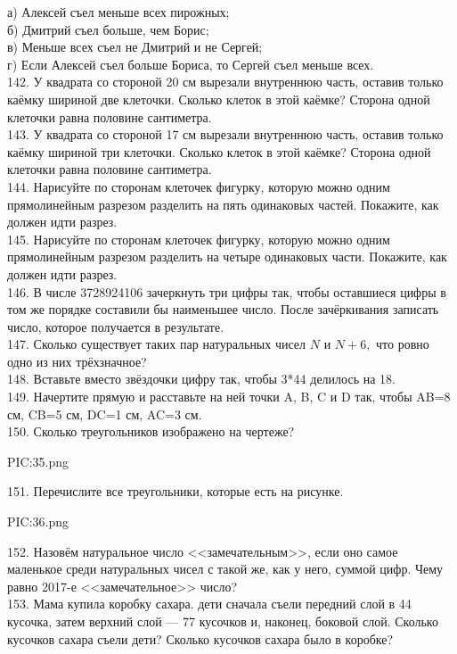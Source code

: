 а) Алексей съел меньше всех пирожных;\\
б) Дмитрий съел больше, чем Борис;\\
в) Меньше всех съел не Дмитрий и не Сергей;\\
г) Если Алексей съел больше Бориса, то Сергей съел меньше всех.\\
142. У квадрата со стороной 20 см вырезали внутреннюю часть, оставив только каёмку шириной две клеточки. Сколько клеток в этой каёмке? Сторона одной клеточки равна половине сантиметра.\\
143. У квадрата со стороной 17 см вырезали внутреннюю часть, оставив только каёмку шириной три клеточки. Сколько клеток в этой каёмке? Сторона одной клеточки равна половине сантиметра.\\
144. Нарисуйте по сторонам клеточек фигурку, которую можно одним прямолинейным разрезом разделить на пять одинаковых частей. Покажите, как должен идти разрез.\\
145. Нарисуйте по сторонам клеточек фигурку, которую можно одним прямолинейным разрезом разделить на четыре одинаковых части. Покажите, как должен идти разрез.\\
146. В числе 3728924106 зачеркнуть три цифры так, чтобы оставшиеся цифры в том же порядке составили бы наименьшее число. После зачёркивания записать число, которое получается в результате.\\
147. Сколько существует таких пар натуральных чисел $N$ и $N+6,$ что ровно одно из них трёхзначное?\\
148. Вставьте вместо звёздочки цифру так, чтобы 3*44 делилось на 18.\\
149. Начертите прямую и расставьте на ней точки A, B, C и D так, чтобы AB=8 см, CB=5 см, DC=1 см, AC=3 см.\\
150. Сколько треугольников изображено на чертеже?
\begin{center}
{{PIC:35.png}}
\end{center}
151. Перечислите все треугольники, которые есть на рисунке.
\begin{center}
{{PIC:36.png}}
\end{center}
152. Назовём натуральное число <<замечательным>>, если оно самое маленькое среди натуральных чисел с такой же, как у него, суммой цифр. Чему равно 2017-е <<замечательное>> число?\\
153. Мама купила коробку сахара. дети сначала съели передний слой в 44 кусочка, затем верхний слой --- 77 кусочков и, наконец, боковой слой. Сколько кусочков сахара съели дети? Сколько кусочков сахара было в коробке?\\
